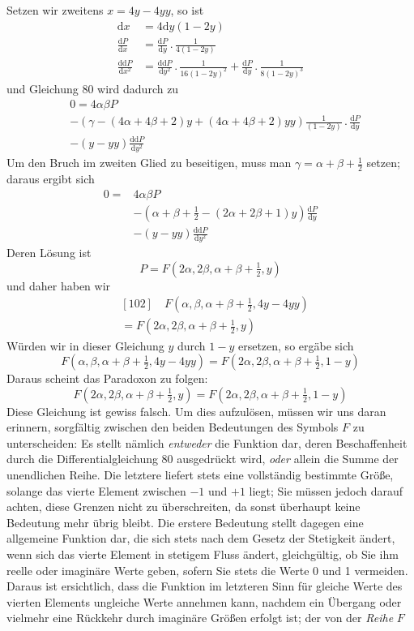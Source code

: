 Setzen wir zweitens $x=4y-4yy$, so ist
\[
\begin{aligned}
\mathrm dx&=4\mathrm dy(1-2y)\\
\frac{\mathrm dP}{\mathrm dx}&=\frac{\mathrm dP}{\mathrm dy}\mathbin{.}\frac1{4(1-2y)}\\
\frac{\mathrm{dd}P}{\mathrm dx^2}&=\frac{\mathrm{dd}P}{\mathrm dy^2}\mathbin{.}\frac1{16(1-2y)^2}
+\frac{\mathrm dP}{\mathrm dy}\mathbin{.}\frac1{8(1-2y)^3}
\end{aligned}
\]
und Gleichung 80 wird dadurch zu
\[
\begin{aligned}
&0=4\alpha\beta P\\
&-(\gamma-(4\alpha+4\beta+2)y+(4\alpha+4\beta+2)yy)\frac1{(1-2y)}\mathbin{.}\frac{\mathrm dP}{\mathrm dy}\\
&-(y-yy)\frac{\mathrm{dd}P}{\mathrm dy^2}
\end{aligned}
\]
Um den Bruch im zweiten Glied zu beseitigen, muss man $\gamma=\alpha+\beta+\frac12$ setzen; daraus ergibt sich
\[
\begin{aligned}
0={}&4\alpha\beta P\\
&-(\alpha+\beta+\tfrac12-(2\alpha+2\beta+1)y)\frac{\mathrm dP}{\mathrm dy}\\
&-(y-yy)\frac{\mathrm{dd}P}{\mathrm dy^2}
\end{aligned}
\]
Deren Lösung ist
\[
P=F(2\alpha,2\beta,\alpha+\beta+\tfrac12,y)
\]
und daher haben wir
\[
\begin{aligned}&[102]\quad F(\alpha,\beta,\alpha+\beta+\tfrac12,4y-4yy)\\&=F(2\alpha,2\beta,\alpha+\beta+\tfrac12,y)\end{aligned}
\]
Würden wir in dieser Gleichung $y$ durch $1-y$ ersetzen, so ergäbe sich
\[
F(\alpha,\beta,\alpha+\beta+\tfrac12,4y-4yy)=F(2\alpha,2\beta,\alpha+\beta+\tfrac12,1-y)
\]
Daraus scheint das Paradoxon zu folgen:
\[
F(2\alpha,2\beta,\alpha+\beta+\tfrac12,y)=F(2\alpha,2\beta,\alpha+\beta+\tfrac12,1-y)
\]
Diese Gleichung ist gewiss falsch. Um dies aufzulösen, müssen wir uns daran erinnern, sorgfältig zwischen den beiden Bedeutungen des Symbols $F$ zu unterscheiden: Es stellt nämlich \textit{entweder} die Funktion dar, deren Beschaffenheit durch die Differentialgleichung 80 ausgedrückt wird, \textit{oder} allein die Summe der unendlichen Reihe. Die letztere liefert stets eine vollständig bestimmte Größe, solange das vierte Element zwischen $-1$ und $+1$ liegt; Sie müssen jedoch darauf achten, diese Grenzen nicht zu überschreiten, da sonst überhaupt keine Bedeutung mehr übrig bleibt. Die erstere Bedeutung stellt dagegen eine allgemeine Funktion dar, die sich stets nach dem Gesetz der Stetigkeit ändert, wenn sich das vierte Element in stetigem Fluss ändert, gleichgültig, ob Sie ihm reelle oder imaginäre Werte geben, sofern Sie stets die Werte 0 und 1 vermeiden. Daraus ist ersichtlich, dass die Funktion im letzteren Sinn für gleiche Werte des vierten Elements ungleiche Werte annehmen kann, nachdem ein Übergang oder vielmehr eine Rückkehr durch imaginäre Größen erfolgt ist; der von der \textit{Reihe} $F$
